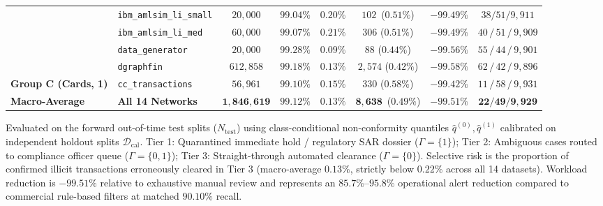 \begin{table}[t]
{\begin{tabular}{llcccccc}
& \texttt{ibm\_amlsim\_li\_small} & $20,000$ & $99.04\%$ & $0.20\%$ & \mbox{$102$ ($0.51\%$)} & $\mathbf{-99.49\%}$ & {$38/51/9,911$} \\
& \texttt{ibm\_amlsim\_li\_med} & $60,000$ & $99.07\%$ & $0.21\%$ & $306$ ($0.51\%$) & $\mathbf{-99.49\%}$ & $40 \,/\, 51 \,/\, 9,909$ \\
& \texttt{data\_generator} & $20,000$ & $99.28\%$ & $0.09\%$ & $88$ ($0.44\%$) & $\mathbf{-99.56\%}$ & $55 \,/\, 44 \,/\, 9,901$ \\
& \texttt{dgraphfin} & $612,858$ & $99.18\%$ & $0.13\%$ & $2,574$ ($0.42\%$) & $\mathbf{-99.58\%}$ & $62 \,/\, 42 \,/\, 9,896$ \\
\midrule
\textbf{Group C (Cards, 1)}
& \texttt{cc\_transactions} & $56,961$ & $99.10\%$ & $0.15\%$ & $330$ ($0.58\%$) & $\mathbf{-99.42\%}$ & $11 \,/\, 58 \,/\, 9,931$ \\
\midrule
\textbf{Macro-Average} & \textbf{All 14 Networks} & $\mathbf{1,846,619}$ & $\mathbf{99.12\%}$ & $\mathbf{0.13\%}$ & \mbox{$\mathbf{8,638}$ ($\mathbf{0.49\%}$)} & $\mathbf{-99.51\%}$ & $\mathbf{22/49/9,929}$ \\
\bottomrule
\end{tabular}%
}
\vspace{0.8ex}

\footnotesize{Evaluated on the forward out-of-time test splits ($N_{\text{test}}$) using class-conditional non-conformity quantiles $\hat{q}^{(0)}, \hat{q}^{(1)}$ calibrated on independent holdout splits $\mathcal{D}_{\text{cal}}$. Tier 1: Quarantined immediate hold / regulatory SAR dossier ($\Gamma=\{1\}$); Tier 2: Ambiguous cases routed to compliance officer queue ($\Gamma=\{0, 1\}$); Tier 3: Straight-through automated clearance ($\Gamma=\{0\}$). Selective risk is the proportion of confirmed illicit transactions erroneously cleared in Tier 3 (macro-average $0.13\%$, strictly below $0.22\%$ across all 14 datasets). Workload reduction is $-99.51\%$ relative to exhaustive manual review and represents an $85.7\%$--$95.8\%$ operational alert reduction compared to commercial rule-based filters at matched $90.10\%$ recall.}
\end{table}

